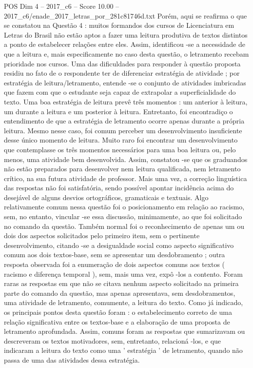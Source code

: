 \begin{textsample}{POS Dim 4 – 2017\_c6 – Score 10.00 – 2017\_c6/enade\_2017\_letras\_por\_281c81746d.txt}
Porém, aqui se reafirma o que se constatou na Questão 4 : muitos formandos dos cursos de Licenciatura em Letras do Brasil não estão aptos a fazer uma leitura produtiva de textos distintos a ponto de estabelecer relações entre eles.
Assim, identificou -se a necessidade de que a leitura e, mais especificamente no caso desta questão, o letramento recebam prioridade nos cursos.
Uma das dificuldades para responder à questão proposta residiu no fato de o respondente ter de diferenciar estratégia de atividade ; por estratégia de leitura/letramento, entende -se o conjunto de atividades imbricadas que fazem com que o estudante seja capaz de extrapolar a superficialidade do texto.
Uma boa estratégia de leitura prevê três momentos : um anterior à leitura, um durante a leitura e um posterior à leitura.
Entretanto, foi encontradiço o entendimento de que a estratégia de letramento ocorre apenas durante a própria leitura.
Mesmo nesse caso, foi comum perceber um desenvolvimento insuficiente desse único momento de leitura.
Muito raro foi encontrar um desenvolvimento que contemplasse os três momentos necessários para uma boa leitura ou, pelo menos, uma atividade bem desenvolvida.
Assim, constatou -se que os graduandos não estão preparados para desenvolver nem leitura qualificada, nem letramento crítico, na sua futura atividade de professor.
Mais uma vez, a correção linguística das respostas não foi satisfatória, sendo possível apontar incidência acima do desejável de alguns desvios ortográficos, gramaticais e textuais.
Algo relativamente comum nessa questão foi o posicionamento em relação ao racismo, sem, no entanto, vincular -se essa discussão, minimamente, ao que foi solicitado no comando da questão.
Também normal foi o reconhecimento de apenas um ou dois dos aspectos solicitados pelo primeiro item, sem o pertinente desenvolvimento, citando -se a desigualdade social como aspecto significativo comum aos dois textos-base, sem se apresentar um desdobramento ; outra resposta observada foi a enumeração de dois aspectos comuns aos textos ( racismo e diferença temporal ), sem, mais uma vez, expô -los a contento.
Foram raras as respostas em que não se citava nenhum aspecto solicitado na primeira parte do comando da questão, mas apenas apresentava, sem desdobramentos, uma atividade de letramento, comumente, a leitura do texto.
Como já indicado, os principais pontos desta questão foram : o estabelecimento correto de uma relação significativa entre os textos-base e a elaboração de uma proposta de letramento aprofundada.
Assim, comuns foram as respostas que sumarizavam ou descreveram os textos motivadores, sem, entretanto, relacioná -los, e que indicaram a leitura do texto como uma ' estratégia ' de letramento, quando não passa de uma das atividades dessa estratégia.

\end{textsample}
